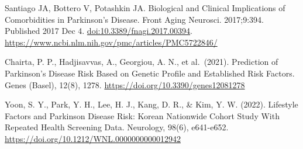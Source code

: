 \documentclass[12pt,]{article}
\begin{document}
Santiago JA, Bottero V, Potashkin JA. Biological and Clinical
Implications of Comorbidities in Parkinson's Disease. Front Aging
Neurosci. 2017;9:394. Published 2017 Dec 4.
\url{doi:10.3389/fnagi.2017.00394}.
\url{https://www.ncbi.nlm.nih.gov/pmc/articles/PMC5722846/}

Chairta, P. P., Hadjisavvas, A., Georgiou, A. N., et al.~(2021).
Prediction of Parkinson's Disease Risk Based on Genetic Profile and
Established Risk Factors. Genes (Basel), 12(8), 1278.
\url{https://doi.org/10.3390/genes12081278}

Yoon, S. Y., Park, Y. H., Lee, H. J., Kang, D. R., \& Kim, Y. W. (2022).
Lifestyle Factors and Parkinson Disease Risk: Korean Nationwide Cohort
Study With Repeated Health Screening Data. Neurology, 98(6), e641-e652.
\url{https://doi.org/10.1212/WNL.0000000000012942}


\end{document}
